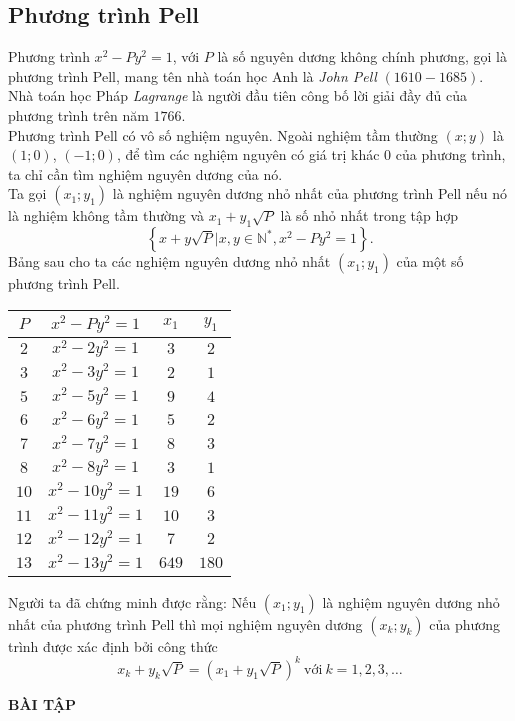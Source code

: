 \subsection{Phương trình Pell} 
Phương trình $x^2-Py^2=1$, với $P$ là số nguyên dương không chính phương, gọi là phương trình Pell, mang tên nhà toán học Anh là \textit{John Pell} $(1610 - 1685)$.\\
Nhà toán học Pháp \textit{Lagrange} là người đầu tiên công bố lời giải đầy đủ của phương trình trên năm $1766$.\\
Phương trình Pell có vô số nghiệm nguyên. Ngoài nghiệm tầm thường $(x;y)$ là $(1;0)$, $(-1;0)$, để tìm các nghiệm nguyên có giá trị khác $0$ của phương trình, ta chỉ cần tìm nghiệm nguyên dương của nó.\\
Ta gọi $(x_1;y_1)$ là nghiệm nguyên dương nhỏ nhất của phương trình Pell nếu nó là nghiệm không tầm thường và $x_1+y_1 \sqrt{P}$ là số nhỏ nhất trong tập hợp 
	$$\left\{ x + y \sqrt{P}\vert x, y \in \mathbb{N}^*, x^2 - Py^2 = 1\right\}.$$
Bảng sau cho ta các nghiệm nguyên dương nhỏ nhất $(x_1;y_1)$ của một số phương trình Pell.
	\begin{center}
	\begin{tabular}{|c|c|c|c|}
	\hline 
	$P$ & $x^2-Py^2 =1$ & $x_1$ & $y_1$\\
	\hline 
	$2$ & $x^2-2y^2=1$ & $3$ & $2$\\
	\hline 
	$3$ & $x^2-3y^2=1$ & $2$ & $1$\\
	\hline 
	$5$ & $x^2-5y^2=1$ & $9$ & $4$\\
	\hline 
	$6$ & $x^2-6y^2=1$ & $5$ & $2$\\
	\hline 
	$7$ & $x^2-7y^2=1$ & $8$ & $3$\\
	\hline 
	$8$ & $x^2-8y^2=1$ & $3$ & $1$\\
	\hline 
	$10$ & $x^2-10y^2=1$ & $19$ & $6$\\
	\hline 
	$11$ & $x^2-11y^2=1$ & $10$ & $3$\\
	\hline 
	$12$ & $x^2-12y^2=1$ & $7$ & $2$\\
	\hline 
	$13$ & $x^2-13y^2=1$ & $649$ & $180$\\
	\hline 
	\end{tabular}
	\end{center}
Người ta đã chứng minh được rằng: Nếu $(x_1;y_1)$ là nghiệm nguyên dương nhỏ nhất của phương trình Pell thì mọi nghiệm nguyên dương $(x_k;y_k)$ của phương trình được xác định bởi công thức 
	$$x_k + y_k \sqrt{P} = \left(x_1 + y_1 \sqrt{P} \right)^k \ \text{với} \ k = 1,2,3, \dots$$
\begin{center}
    \textbf{BÀI TẬP}
\end{center}

